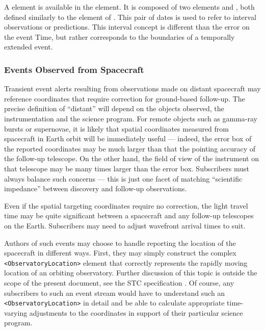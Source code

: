 \documentclass[11pt,a4paper]{ivoa}
\begin{document}
A  element is available in the
 element. It is composed of two elements
 and , both defined similarly to
the  element of . This pair of dates is used to refer to
interval observations or predictions. This interval concept is different than
the error on the event Time, but rather corresponds to the boundaries of a
temporally extended event.

\subsubsection{Events Observed from Spacecraft}
\label{sec:3.4.5}
Transient event alerts resulting from observations made on distant spacecraft
may reference coordinates that require correction for ground-based follow-up.
The precise definition of ``distant'' will depend on the objects observed, the
instrumentation and the science program. For remote objects such as gamma-ray
bursts or supernovae, it is likely that spatial coordinates measured from
spacecraft in Earth orbit will be immediately useful --- indeed, the error box
of the reported coordinates may be much larger than that the pointing accuracy
of the follow-up telescope. On the other hand, the field of view of the
instrument on that telescope may be many times larger than the error box.
Subscribers must always balance such concerns --- this is just one facet of
matching ``scientific impedance'' between discovery and follow-up observations.

Even if the spatial targeting coordinates require no correction, the light
travel time may be quite significant between a spacecraft and any follow-up
telescopes on the Earth. Subscribers may need to adjust wavefront arrival times
to suit.

Authors of such events may choose to handle reporting the location of the
spacecraft in different ways. First, they may simply construct the
complex \verb|<ObservatoryLocation>| element that correctly represents the rapidly moving
location of an orbiting observatory. Further discussion of this topic is outside
the scope of the present document, see the STC specification
\citep{2007ivoa.spec.1030R}. Of course, any subscribers to such an event stream
would have to understand such an \verb|<ObservatoryLocation>| in detail and be
able to calculate appropriate time-varying adjustments to the coordinates in
support of their particular science program.
\end{document}
